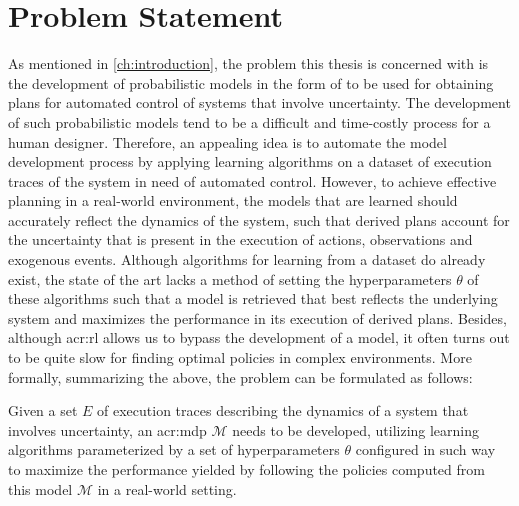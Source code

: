 \section{Problem Statement}
\label{sec:problem-statement}

As mentioned in \autoref{ch:introduction}, the problem this thesis is concerned with is the development of probabilistic models in the form of  to be used for obtaining plans for automated control of systems that involve uncertainty.
The development of such probabilistic models tend to be a difficult and time-costly process for a human designer.
Therefore, an appealing idea is to automate the model development process by applying learning algorithms on a dataset of execution traces of the system in need of automated control.
However, to achieve effective planning in a real-world environment, the models that are learned should accurately reflect the dynamics of the system, such that derived plans account for the uncertainty that is present in the execution of actions, observations and exogenous events.
Although algorithms for learning  from a dataset do already exist, the state of the art lacks a method of setting the hyperparameters $\theta$ of these algorithms such that a model is retrieved that best reflects the underlying system and maximizes the performance in its execution of derived plans.
Besides, although \acrfull{acr:rl} allows us to bypass the development of a model, it often turns out to be quite slow for finding optimal policies in complex environments.
More formally, summarizing the above, the problem can be formulated as follows:

\begin{problem}
	Given a set $E$ of execution traces describing the dynamics of a system that involves uncertainty, an \acrshort{acr:mdp} $\mathcal{M}$ needs to be developed, utilizing learning algorithms parameterized by a set of hyperparameters $\theta$ configured in such way to maximize the performance yielded by following the policies computed from this model $\mathcal{M}$ in a real-world setting.
\end{problem}

